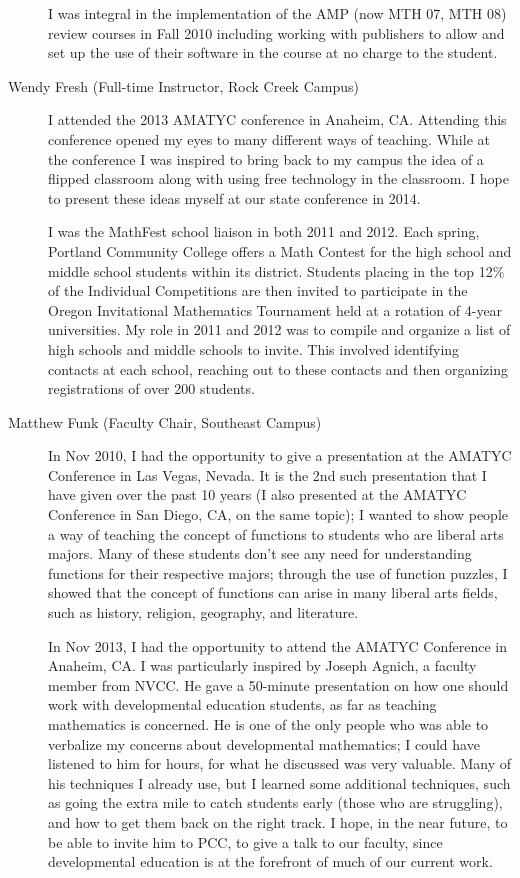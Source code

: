 \begin{description}
	I was integral in the implementation of the AMP (now MTH 07, MTH 08) review
	courses in Fall 2010 including working with publishers to allow and set up the
	use of their software in the course at no charge to the student.

	\item[Wendy Fresh (Full-time Instructor, Rock Creek Campus)]
	I attended the 2013 AMATYC conference in Anaheim, CA.  Attending this
	conference opened my eyes to many different ways of teaching.  While at the
	conference I was inspired to bring back to my campus the idea of a
	flipped classroom along with using free technology in the classroom.  I
	hope to present these ideas myself at our state conference in 2014.

	I was the MathFest school liaison in both 2011 and 2012.  Each spring, Portland
	Community College offers a Math Contest for the high school and middle school
	students within its district.  Students placing in the top 12\% of the
	Individual Competitions are then invited to participate in the Oregon
	Invitational Mathematics Tournament held at a rotation of 4-year universities.
	My role in 2011 and 2012 was to compile and organize a list of high schools and
	middle schools to invite.  This involved identifying contacts at each school,
	reaching out to these contacts and then organizing registrations of over 200
	students.

	\item[Matthew Funk (Faculty Chair, Southeast Campus)]
	In Nov 2010, I had the opportunity to give a presentation at the AMATYC
	Conference in Las Vegas, Nevada.  It is the 2nd such presentation that I have
	given over the past 10 years (I also presented at the AMATYC Conference in San
	Diego, CA, on the same topic); I wanted to show people a way of teaching the
	concept of functions to students who are liberal arts majors.  Many of these
	students don't see any need for understanding functions for their respective
	majors; through the use of function puzzles, I showed that the concept of
	functions can arise in many liberal arts fields, such as history, religion,
	geography, and literature.

	In Nov 2013, I had the opportunity to attend the AMATYC Conference in Anaheim,
	CA.  I was particularly inspired by Joseph Agnich, a faculty member from NVCC.
	He gave a 50-minute presentation on how one should work with developmental
	education students, as far as teaching mathematics is concerned.  He is one of
	the only people who was able to verbalize my concerns about developmental
	mathematics; I could have listened to him for hours, for what he discussed was
	very valuable.  Many of his techniques I already use, but I learned some
	additional techniques, such as going the extra mile to catch students early
	(those who are struggling), and how to get them back on the right track.  I
	hope, in the near future, to be able to invite him to PCC, to give a talk to
	our faculty, since developmental education is at the forefront of much of our
	current work.


\end{description}
